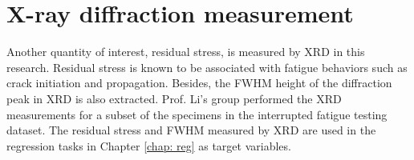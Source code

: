 \section{X-ray diffraction measurement}
Another quantity of interest, residual stress, is measured by XRD in this research. Residual stress is known to be associated with fatigue behaviors such as crack initiation and propagation. Besides, the FWHM height of the diffraction peak in XRD is also extracted. Prof. Li's group performed the XRD measurements for a subset of the specimens in the interrupted fatigue testing dataset. The residual stress and FWHM measured by XRD are used in the regression tasks in Chapter \ref{chap: reg} as target variables.
